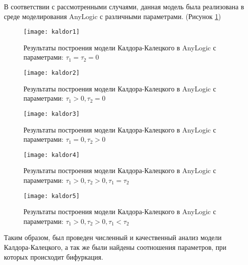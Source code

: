 \newpage

В соответствии с рассмотренными случаями, данная модель была реализована в среде моделирования AnyLogic с различными параметрами. (Рисунок \ref{fig:kaldor1})
\begin{figure}[h]
	\centering \texttt{[image: kaldor1]}
	\caption{Результаты построения модели Калдора-Калецкого в AnyLogic с параметрами: $\tau_1 = \tau_2 = 0$}
	\label{fig:kaldor1}
\end{figure}

\begin{figure}[h]
	\centering \texttt{[image: kaldor2]}
	\caption{Результаты построения модели Калдора-Калецкого в AnyLogic с параметрами: $\tau_1 > 0, \tau_2 = 0$}
	\label{fig:kaldor2}
\end{figure}

\newpage

\begin{figure}[h]
	\centering \texttt{[image: kaldor3]}
	\caption{Результаты построения модели Калдора-Калецкого в AnyLogic с параметрами: $\tau_1 = 0, \tau_2 > 0$}
	\label{fig:kaldor3}
\end{figure}

\begin{figure}[h]
	\centering \texttt{[image: kaldor4]}
	\caption{Результаты построения модели Калдора-Калецкого в AnyLogic с параметрами: $\tau_1 > 0, \tau_2 > 0, \tau_1 = \tau_2$}
	\label{fig:kaldor4}
\end{figure}

\newpage

\begin{figure}[h]
	\centering \texttt{[image: kaldor5]}
	\caption{Результаты построения модели Калдора-Калецкого в AnyLogic с параметрами: $\tau_1 > 0, \tau_2 > 0, \tau_1 < \tau_2$}
	\label{fig:kaldor5}
\end{figure}

Таким образом, был проведен численный и качественный анализ модели Калдора-Калецкого, а так же были найдены соотношения параметров, при которых происходит бифуркация.